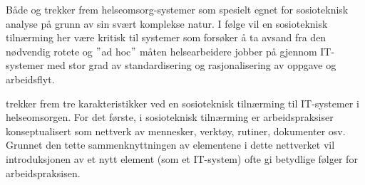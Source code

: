 \noindent
Både \citet{Coiera07} og \citet{Berg99} trekker frem helseomsorg-systemer som spesielt egnet for sosioteknisk analyse på grunn av sin svært komplekse natur. I følge \citet{Berg99} vil en sosioteknisk tilnærming her være kritisk til systemer som forsøker å ta avsand fra den nødvendig rotete og $"$ad hoc$"$ måten helsearbeidere jobber på gjennom IT-systemer med stor grad av standardisering og rasjonalisering av oppgave og arbeidsflyt.

\citet{Berg99} trekker frem tre karakteristikker ved en sosioteknisk tilnærming til IT-systemer i helseomsorgen. For det første, i sosioteknisk tilnærming er arbeidspraksiser konseptualisert som nettverk av mennesker, verktøy, rutiner, dokumenter osv. Grunnet den tette sammenknyttningen av elementene i dette nettverket vil introduksjonen av et nytt element (som et IT-system) ofte gi betydlige følger for arbeidspraksisen. 






